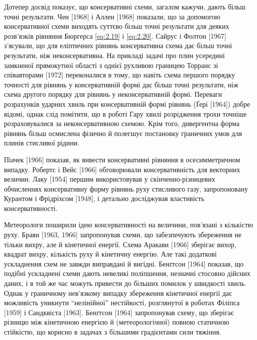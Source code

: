 Дотепер досвід показує, що консервативні схеми, загалом кажучи, дають більш точні результати. Чен [1968] і Аллен [1968] показали, що за допомогою консервативної схеми виходять суттєво більш точні результати для деяких розв'язків рівняння Бюргерса \eqref{eq:2.19} і \eqref{eq:2.20}. Сайрус і Фолтон [1967] з'ясували, що для еліптичних рівнянь консервативна схема дає більш точні результати, ніж неконсервативна. На прикладі задачі про плин усередині замкненої прямокутної області з однієї рухливою границею Торранс зі співавторами [1972] переконалися в тому, що навіть схема першого порядку точності для рівнянь у консервативній формі дає більш точні результати, ніж схема другого порядку для рівнянь у неконсервативній формі. Переваги розрахунків ударних хвиль при консервативній формі рівнянь (Ґері [1964]) добре відомі, однак слід помітити, що в роботі Гару хвилі розрідження трохи точніше розраховувалися за неконсервативною схемою. Крім того, дивергентна форма рівнянь більш осмислена фізично й полегшує постановку граничних умов для плинів стисливої рідини. \medskip

Піачек [1966] показав, як вивести консервативні рівняння в осесимметричном випадку. Робертс і Вейс [1966] обговорювали консервативність для векторних величин. Лаку [1954] першим використовував у скінченно-різницевих обчисленнях консервативну форму рівнянь руху стисливого газу, запропоновану Курантом і Фрідріхсом [1948], і детально досліджував властивість консервативності. \medskip

Метеорологи поширили ідею консервативності на величини, пов'язані з кількістю руху. Браян [1963, 1966] запропонував схеми, що забезпечують збереження не тільки вихру, але й кінетичної енергії. Схема Аракави [1966] зберігає вихор, квадрат вихру, кількість руху й кінетичну енергію. Але такі додаткові ускладнення схем не завжди виправдані й вигідні. Бенґтсон [1964] показав, що подібні ускладнені схеми дають невеликі поліпшення, незначні стосовно дійсних даних, і в той же час можуть привести до більших помилок у швидкості хвиль. Однак у граничному нев'язкому випадку збереження кінетичної енергії дає можливість уникнути ``нелінійної'' нестійкості, розглянутої в роботах Філіпса [1959] і Сандквіста [1963]. Бенґтсон [1964] запропонував схему, що зберігає різницю між кінетичною енергією й (метеорологічної) повною статичною стійкістю, що корисно в задачах з більшими градієнтами сили тяжіння. \medskip

